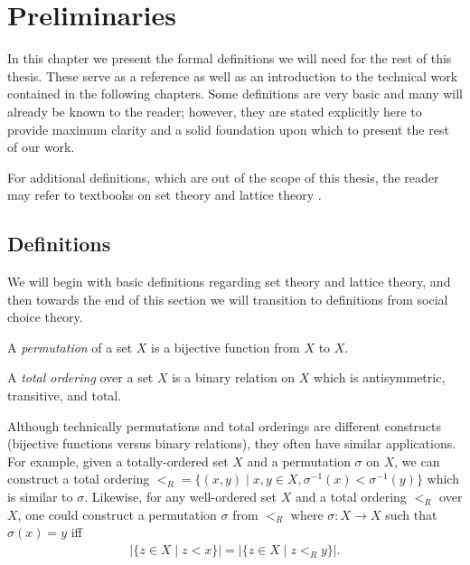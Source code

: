 
\chapter{Preliminaries}

	In this chapter we present the formal definitions we will need for the rest of this thesis. These serve as a reference as well as an introduction to the technical work contained in the following chapters. Some definitions are very basic and many will already be known to the reader; however, they are stated explicitly here to provide maximum clarity and a solid foundation upon which to present the rest of our work.

	For additional definitions, which are out of the scope of this thesis, the reader may refer to textbooks on set theory \cite{kunen1980set} and lattice theory \cite{birkhoff1995lattice}.

\section{Definitions}

	We will begin with basic definitions regarding set theory and lattice theory, and then towards the end of this section we will transition to definitions from social choice theory.

	\begin{definition}
		A \emph{permutation} of a set $X$ is a bijective function from $X$ to $X$.
	\end{definition}

	\begin{definition}
		A \emph{total ordering} over a set $X$ is a binary relation on $X$ which is antisymmetric, transitive, and total.
	\end{definition}

	Although technically permutations and total orderings are different constructs (bijective functions versus binary relations), they often have similar applications. For example, given a totally-ordered set $X$ and a permutation $\sigma$ on $X$, we can construct a total ordering $<_R = \{(x,y) \mid x, y \in X, \sigma^{-1}(x) < \sigma^{-1}(y)\}$ which is similar to $\sigma$. Likewise, for any well-ordered set $X$ and a total ordering $<_R$ over $X$, one could construct a permutation $\sigma$ from $<_R$ where $\sigma : X \to X$ such that $\sigma(x) = y$ iff
	\begin{align*}
		|\{z \in X \mid z < x\}| = |\{z \in X \mid z <_R y\}|.
	\end{align*}

